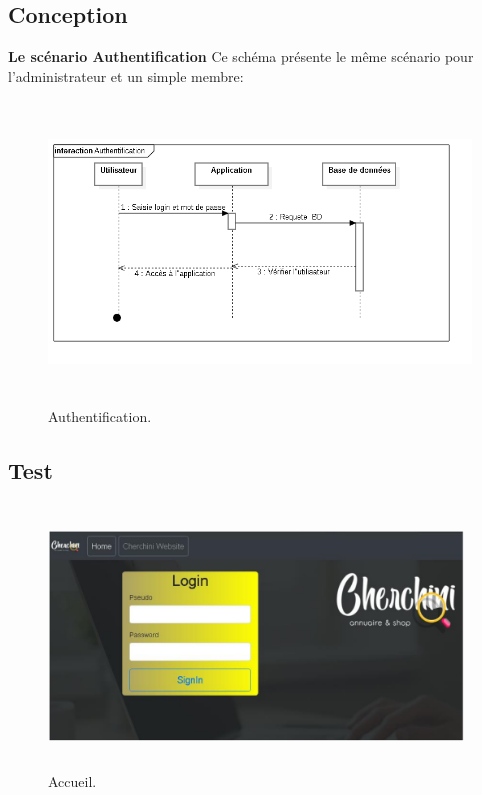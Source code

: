 
\subsection{Conception}
\textbf{Le sc\'{e}nario \guillemotleft{} Authentification \guillemotright{}}
Ce sch\'{e}ma pr\'{e}sente le m\^{e}me sc\'{e}nario pour l'administrateur et un simple
membre:


\begin{figure}[H]
\center
\includegraphics[width=14cm,height=8cm]{./figures/seq/A.png}
\caption{Authentification.}
\end{figure}


\subsection{Test}


\begin{figure}[H]
\center
\includegraphics[width=11cm,height=7cm]{./figures/pres/1.png}
\caption{Accueil.}

\end{figure}
 